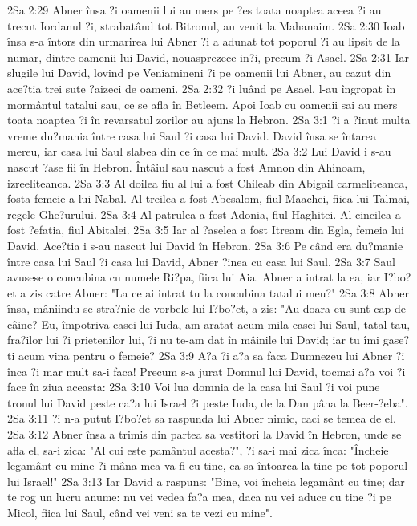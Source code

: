 2Sa 2:29  Abner însa ?i oamenii lui au mers pe ?es toata noaptea aceea ?i au trecut Iordanul ?i, strabatând tot Bitronul, au venit la Mahanaim.
2Sa 2:30  Ioab însa s-a întors din urmarirea lui Abner ?i a adunat tot poporul ?i au lipsit de la numar, dintre oamenii lui David, nouasprezece in?i, precum ?i Asael.
2Sa 2:31  Iar slugile lui David, lovind pe Veniamineni ?i pe oamenii lui Abner, au cazut din ace?tia trei sute ?aizeci de oameni.
2Sa 2:32  ?i luând pe Asael, l-au îngropat în mormântul tatalui sau, ce se afla în Betleem. Apoi Ioab cu oamenii sai au mers toata noaptea ?i în revarsatul zorilor au ajuns la Hebron.
2Sa 3:1  ?i a ?inut multa vreme du?mania între casa lui Saul ?i casa lui David. David însa se întarea mereu, iar casa lui Saul slabea din ce în ce mai mult.
2Sa 3:2  Lui David i s-au nascut ?ase fii în Hebron. Întâiul sau nascut a fost Amnon din Ahinoam, izreeliteanca.
2Sa 3:3  Al doilea fiu al lui a fost Chileab din Abigail carmeliteanca, fosta femeie a lui Nabal. Al treilea a fost Abesalom, fiul Maachei, fiica lui Talmai, regele Ghe?urului.
2Sa 3:4  Al patrulea a fost Adonia, fiul Haghitei. Al cincilea a fost ?efatia, fiul Abitalei.
2Sa 3:5  Iar al ?aselea a fost Itream din Egla, femeia lui David. Ace?tia i s-au nascut lui David în Hebron.
2Sa 3:6  Pe când era du?manie între casa lui Saul ?i casa lui David, Abner ?inea cu casa lui Saul.
2Sa 3:7  Saul avusese o concubina cu numele Ri?pa, fiica lui Aia. Abner a intrat la ea, iar I?bo?et a zis catre Abner: "La ce ai intrat tu la concubina tatalui meu?"
2Sa 3:8  Abner însa, mâniindu-se stra?nic de vorbele lui I?bo?et, a zis: "Au doara eu sunt cap de câine? Eu, împotriva casei lui Iuda, am aratat acum mila casei lui Saul, tatal tau, fra?ilor lui ?i prietenilor lui, ?i nu te-am dat în mâinile lui David; iar tu îmi gase?ti acum vina pentru o femeie?
2Sa 3:9  A?a ?i a?a sa faca Dumnezeu lui Abner ?i înca ?i mar mult sa-i faca! Precum s-a jurat Domnul lui David, tocmai a?a voi ?i face în ziua aceasta:
2Sa 3:10  Voi lua domnia de la casa lui Saul ?i voi pune tronul lui David peste ca?a lui Israel ?i peste Iuda, de la Dan pâna la Beer-?eba".
2Sa 3:11  ?i n-a putut I?bo?et sa raspunda lui Abner nimic, caci se temea de el.
2Sa 3:12  Abner însa a trimis din partea sa vestitori la David în Hebron, unde se afla el, sa-i zica: "Al cui este pamântul acesta?", ?i sa-i mai zica înca: "Încheie legamânt cu mine ?i mâna mea va fi cu tine, ca sa întoarca la tine pe tot poporul lui Israel!"
2Sa 3:13  Iar David a raspuns: "Bine, voi încheia legamânt cu tine; dar te rog un lucru anume: nu vei vedea fa?a mea, daca nu vei aduce cu tine ?i pe Micol, fiica lui Saul, când vei veni sa te vezi cu mine".
